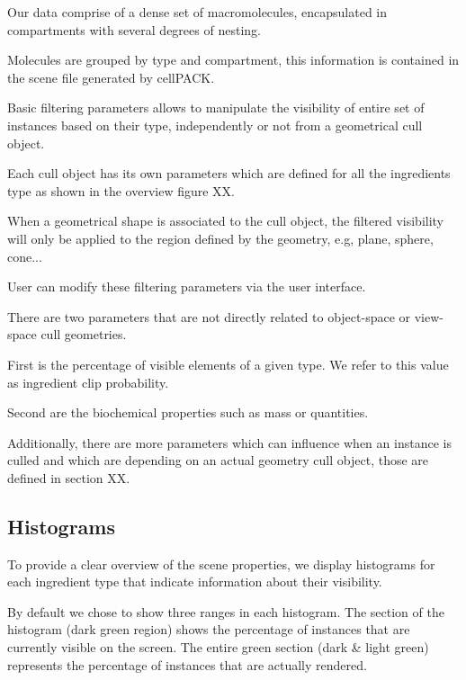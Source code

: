 
Our data comprise of a dense set of macromolecules, encapsulated in compartments with several degrees of nesting. 

Molecules are grouped by type and compartment, this information is contained in the scene file generated by cellPACK.

Basic filtering parameters allows to manipulate the visibility of entire set of instances based on their type, independently or not from a geometrical cull object.

Each cull object has its own parameters which are defined for all the ingredients type as shown in the overview figure XX.

When a geometrical shape is associated to the cull object, the filtered visibility will only be applied to the region defined by the geometry, e.g, plane, sphere, cone...

User can modify these filtering parameters via the user interface.

There are two parameters that are not directly related to object-space or view-space cull geometries.

First is the percentage of visible elements of a given type. 
We refer to this value as ingredient clip probability.

Second are the biochemical properties such as mass or quantities.

Additionally, there are more parameters which can influence when an instance is culled and which are depending on an actual geometry cull object, those are defined in section XX.


\subsection{Histograms}

To provide a clear overview of the scene properties, we display histograms for each ingredient type that indicate information about their visibility.

By default we chose to show three ranges in each histogram. The section of the histogram (dark green region) shows the percentage of instances that are currently visible on the screen. 
The entire green section (dark \& light green) represents the percentage of instances that are actually rendered.

